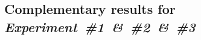 \begin{appendices}
\section{Complementary results for \emph{Experiment~\#1~\&~\#2~\&~\#3}}\label{app:1}



\end{appendices}

